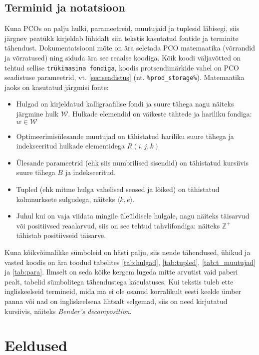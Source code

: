 \documentclass[10pt,a4paper]{article}
\begin{document}
\subsection{Terminid ja notatsioon}
\label{sec:terminid}
Kuna PCOs on palju hulki, parameetreid, muutujaid ja tuplesid läbisegi, siis  järgnev peatükk kirjeldab lühidalt siin tekstis kasutatud fontide ja terminite tähendust. Dokumentatsiooni mõte on ära seletada PCO matemaatika (võrran\-did ja võrratused) ning siduda ära see reaalse koodiga. Kõik koodi väljavõtted on tehtud sellise \texttt{trükimasina fondiga}, koodis protsendimärkide vahel on PCO seadistuse parameetrid, vt. \ref{sec:seadistus} (nt. \texttt{\%prod\_storage\%}). Matemaatika jaoks on kasutatud järgmisi fonte:
\begin{itemize}
\item Hulgad on kirjeldatud kalligraafilise fondi ja suure tähega nagu näiteks järgmine hulk $\mathcal{W}$. Hulkade elemendid on väikeste tähtede ja hariliku fondiga: $w \in \mathcal{W}$
\item Optimeerimisülesande muutujad on tähistatud hariliku suure tähega ja indekseeritud hulkade elementidega $R(i,j,k)$
\item Ülesande parameetrid (ehk siis numbrilised sisendid) on tähistatud kursiivis suure tähega $\mathit{B}$ ja indekseeritud.
\item Tupled (ehk mitme hulga vahelised seosed ja lõiked) on tähistatud kolmnurksete sulgudega, näiteks $\langle k, e \rangle$.
\item Juhul kui on vaja viidata mingile üleüldisele hulgale, nagu näiteks täis\-arvud või positiivsed reaalarvud, siis on see tehtud tahvlifondiga: näiteks $\mathbb{Z}^+$ tähistab positiivseid täisarve.
\end{itemize}
Kuna kõikvõimalikke sümboleid on hästi palju, siis nende tähendused, ühikud ja vasted koodis on ära toodud tabelites \ref{tab:hulgad}, \ref{tab:tupled}, \ref{tab:t_muutujad} ja \ref{tab:para}. Ilmselt on seda kõike kergem lugeda mitte arvutist vaid paberi pealt, tabelid sümbolitega tähendustega käeulatuses.
Kui tekstis tuleb ette ingliskeelseid termineid, mida ma ei ole osanud korralikult eesti keelde ümber panna või nad on ingliskeelsena lihtsalt selgemad, siis on need kirjutatud kursiivis, näiteks \emph{Bender's decomposition}.

\section{Eeldused}
\end{document}
